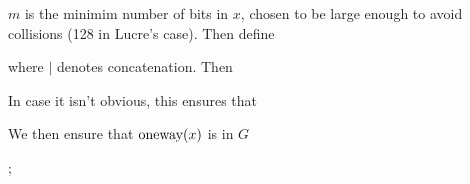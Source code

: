 \documentclass[a4paper,titlepage]{article}
\begin{document}

$m$ is the minimim number of bits in $x$, chosen to be large
enough to avoid collisions (128 in Lucre's case). Then define


where $|$ denotes concatenation. Then


In case it isn't obvious, this ensures that


We then ensure that $\textrm{oneway}(x)$ is in $G$

;
\end{document}
